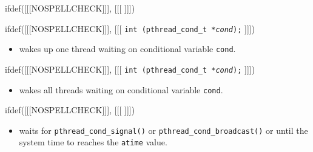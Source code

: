 
ifdef([[[NOSPELLCHECK]]], [[[
]]])

\begin{slide}
\prgchars
ifdef([[[NOSPELLCHECK]]], [[[
\texttt{int (pthread\_cond\_t *\emph{cond});}
]]])
\begin{itemize}
\item wakes up one thread waiting on conditional variable
\texttt{cond}.
\end{itemize}
ifdef([[[NOSPELLCHECK]]], [[[
\texttt{int (pthread\_cond\_t *\emph{cond});}
]]])
\begin{itemize}
\item wakes all threads waiting on conditional variable
\texttt{cond}.
\end{itemize}
ifdef([[[NOSPELLCHECK]]], [[[
]]])
\begin{itemize}
\item waits for \texttt{pthread\_cond\_signal()} or
\texttt{pthread\_cond\_broadcast()} or until the system time to reaches the
\texttt{atime} value.
\end{itemize}
\end{slide}

